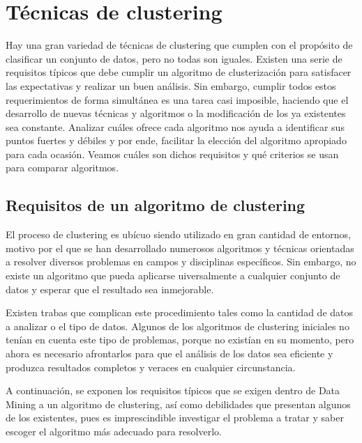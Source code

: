 \documentclass[10pt, a4paper]{article}
\begin{document}
\section{Técnicas de clustering} \label{sec:Técnicas de clustering}

Hay una gran variedad de técnicas de clustering que cumplen con el propósito de clasificar un conjunto de datos, pero no todas son iguales. Existen una serie de requisitos típicos que debe cumplir un algoritmo de clusterización para satisfacer las expectativas y realizar un buen análisis. Sin embargo, cumplir todos estos requerimientos de forma simultánea es una tarea casi imposible, haciendo que el desarrollo de nuevas técnicas y algoritmos o la modificación de los ya existentes sea constante. Analizar cuáles ofrece cada algoritmo nos ayuda a identificar sus puntos fuertes y débiles y por ende, facilitar la elección del algoritmo apropiado para cada ocasión. Veamos cuáles son dichos requisitos y qué criterios se usan para comparar algoritmos.

\subsection{\textbf{Requisitos de un algoritmo de clustering}} \label{subsec:Requisitos de un algoritmo de clustering}

\cite{LIBRO} El proceso de clustering es ubícuo siendo utilizado en gran cantidad de entornos, motivo por el que se han desarrollado numerosos algoritmos y técnicas orientadas a resolver diversos problemas en campos y disciplinas específicos. Sin embargo, no existe un algoritmo que pueda aplicarse uiversalmente a cualquier conjunto de datos y esperar que el resultado sea inmejorable. 

Existen trabas que complican este procedimiento tales como la cantidad de datos a analizar o el tipo de datos. Algunos de los algoritmos de clustering iniciales no tenían en cuenta este tipo de problemas, porque no existían en su momento, pero ahora es necesario afrontarlos para que el análisis de los datos sea eficiente y produzca resultados completos y veraces en cualquier circunstancia.

A continuación, se exponen los requisitos típicos que se exigen dentro de Data Mining a un algoritmo de clustering, así como debilidades que presentan algunos de los existentes, pues es imprescindible investigar el problema a tratar y saber escoger el algoritmo más adecuado para resolverlo.
 
\end{document}
